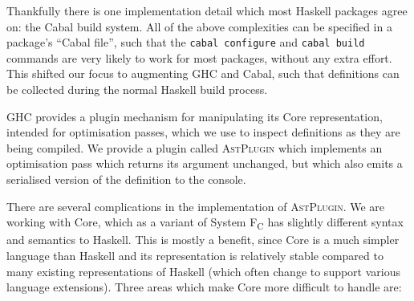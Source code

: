 Thankfully there is one implementation detail which most Haskell packages agree on: the Cabal build system. All of the above complexities can be specified in a package's ``Cabal file'', such that the \texttt{cabal configure} and \texttt{cabal build} commands are very likely to work for most packages, without any extra effort. This shifted our focus to augmenting GHC and Cabal, such that definitions can be collected during the normal Haskell build process.

GHC provides a plugin mechanism for manipulating its Core representation, intended for optimisation passes, which we use to inspect definitions as they are being compiled. We provide a plugin called \textsc{AstPlugin} which implements an optimisation pass which returns its argument unchanged, but which also emits a serialised version of the definition to the console.

There are several complications in the implementation of \textsc{AstPlugin}. We are working with Core, which as a variant of System F\textsubscript{C} \citep{sulzmann2007system} has slightly different syntax and semantics to Haskell. This is mostly a benefit, since Core is a much simpler language than Haskell and its representation is relatively stable compared to many existing representations of Haskell (which often change to support various language extensions). Three areas which make Core more difficult to handle are:

